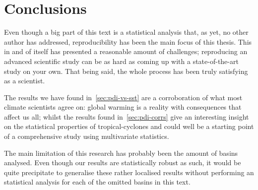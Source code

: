 \section{Conclusions}

Even though a big part of this text is a statistical analysis that, as yet, no other author has addressed, reproducibility has been the main focus of this thesis. This in and of itself has presented a reasonable amount of challenges; reproducing an advanced scientific study can be as hard as coming up with a state-of-the-art study on your own.
That being said, the whole process has been truly satisfying as a scientist.

The results we have found in~\cref{sec:pdi-vs-sst} are a corroboration of what most climate scientists agree on: global warming is a reality with consequences that affect us all; whilst the results found in~\cref{sec:pdi-corrs} give an interesting insight on the statistical properties of tropical-cyclones and could well be a starting point of a comprehensive study using multivariate statistics.

The main limitation of this research has probably been the amount of basins analysed. Even though our results are statistically robust as such, it would be quite precipitate to generalise these rather localised results without performing an statistical analysis for each of the omitted basins in this text.
